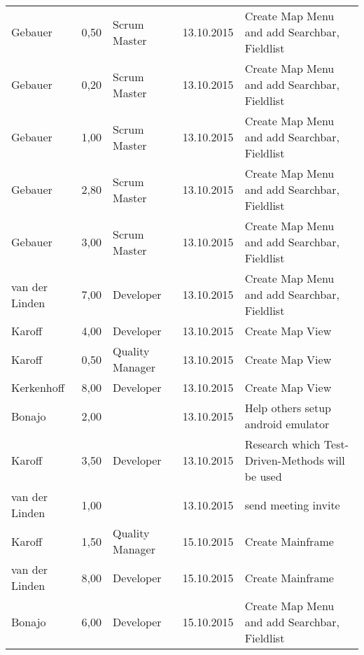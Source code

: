 \begin{longtable}{ l r p{2cm} c p{4cm} }
		Gebauer                 & 0,50           & Scrum Master    & 13.10.2015    & Create Map Menu and add Searchbar, Fieldlist \\
		Gebauer                 & 0,20           & Scrum Master    & 13.10.2015    & Create Map Menu and add Searchbar, Fieldlist \\
		Gebauer                 & 1,00           & Scrum Master    & 13.10.2015    & Create Map Menu and add Searchbar, Fieldlist \\
		Gebauer                 & 2,80           & Scrum Master    & 13.10.2015    & Create Map Menu and add Searchbar, Fieldlist \\
		Gebauer                 & 3,00           & Scrum Master    & 13.10.2015    & Create Map Menu and add Searchbar, Fieldlist \\
		van der Linden          & 7,00           & Developer       & 13.10.2015    & Create Map Menu and add Searchbar, Fieldlist \\
		Karoff                  & 4,00           & Developer       & 13.10.2015    & Create Map View                              \\
		Karoff                  & 0,50           & Quality Manager & 13.10.2015    & Create Map View                              \\
		Kerkenhoff              & 8,00           & Developer       & 13.10.2015    & Create Map View                              \\
		Bonajo                  & 2,00           &                 & 13.10.2015    & Help others setup android emulator          \\
		Karoff                  & 3,50           & Developer             & 13.10.2015    & Research which Test-Driven-Methods will be used                                 \\
		van der Linden          & 1,00           &                       & 13.10.2015    & send meeting invite                                                             \\
		Karoff                  & 1,50           & Quality Manager       & 15.10.2015    & Create Mainframe                                                                \\
		van der Linden          & 8,00           & Developer             & 15.10.2015    & Create Mainframe                                                                \\
		Bonajo                  & 6,00           & Developer             & 15.10.2015    & Create Map Menu and add Searchbar, Fieldlist                                    \\

\end{longtable}
